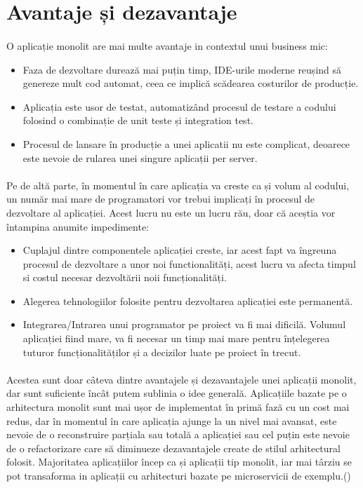 \documentclass[12pt]{report}
\begin{document}
  	\section{Avantaje și dezavantaje}
  	\paragraph{}O aplicație monolit are mai multe avantaje in contextul unui business mic:  	
  	\begin{itemize}
  	\item Faza de dezvoltare durează mai puțin timp, IDE-urile moderne reușind să genereze mult cod automat, ceea ce implică scădearea costurilor de producție.
  	\item Aplicația este usor de testat, automatizând procesul de testare a codului folosind o combinație de unit teste și integration test. 
  	\item Procesul de lansare în producție a unei aplicatii nu este complicat, deoarece este nevoie de rularea unei singure aplicații per server.
  	\end{itemize}
  	\paragraph{}Pe de altă parte, în momentul în care aplicația va creste ca și volum al codului, un număr mai mare de programatori vor trebui implicați în procesul de dezvoltare al aplicației. Acest lucru nu este un lucru rău, doar că aceștia vor întampina anumite impedimente:
  	\begin{itemize}
  	\item Cuplajul dintre componentele aplicației creste, iar acest fapt va îngreuna procesul de dezvoltare a unor noi functionalități, acest lucru va afecta timpul si costul necesar dezvoltării noii funcționalități.  
	\item Alegerea tehnologiilor folosite pentru dezvoltarea aplicației este permanentă.
	\item Integrarea/Intrarea unui programator pe proiect va fi mai dificilă. Volumul aplicației fiind mare, va fi necesar un timp mai mare pentru înțelegerea tuturor funcționalităților și a decizilor luate pe proiect în trecut.
  	\end{itemize}
  	\paragraph{}Acestea sunt doar câteva dintre avantajele și dezavantajele unei aplicații monolit, dar sunt suficiente încât putem sublinia o idee generală. Aplicațiile bazate pe o arhitectura monolit sunt mai ușor de implementat în primă fază cu un cost mai redus, dar în momentul în care aplicația ajunge la un nivel mai avansat, este nevoie de o reconstruire parțiala sau totală a aplicației sau cel puțin este nevoie de o refactorizare care să diminueze dezavantajele create de stilul arhitectural folosit. Majoritatea aplicațiilor încep ca și aplicații tip monolit, iar mai târziu se pot transaforma in aplicații cu arhitecturi bazate pe microservicii de exemplu.(\cite{thones2015microservices})
\end{document}

